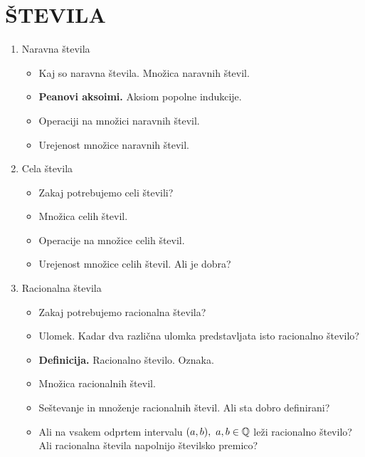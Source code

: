 \section{ŠTEVILA}


\begin{enumerate}
    \item Naravna števila
    \begin{itemize}
        \item Kaj so naravna števila. Množica naravnih števil. 
        \item \textbf{Peanovi aksoimi.} Aksiom popolne indukcije.
        \item Operaciji na množici naravnih števil.
        \item Urejenost množice naravnih števil.        
    \end{itemize}

    \item Cela števila
    \begin{itemize}
        \item Zakaj potrebujemo celi števili?
        \item Množica celih števil.
        \item Operacije na množice celih števil.
        \item Urejenost množice celih števil. Ali je dobra?
    \end{itemize}

    \item Racionalna števila
    \begin{itemize}
        \item Zakaj potrebujemo racionalna števila?
        \item Ulomek. Kadar dva različna ulomka predstavljata isto racionalno število?
        \item \colorbox{purple!30}{\textbf{Definicija.}} Racionalno število. Oznaka.
        \item Množica racionalnih števil.
        \item Seštevanje in množenje racionalnih števil. Ali sta dobro definirani?
        \item Ali na vsakem odprtem intervalu $(a,b), \ a,b \in \mathbb{Q}$ leži racionalno število? Ali racionalna števila napolnijo številsko premico?
    \end{itemize}


\end{enumerate}
